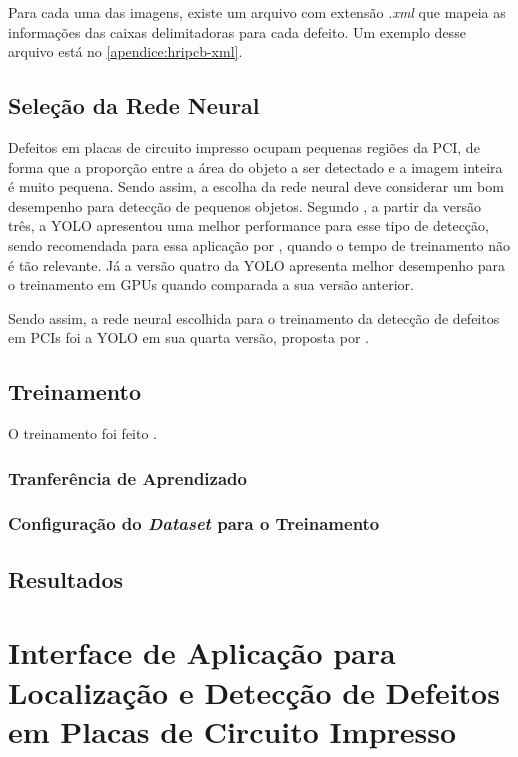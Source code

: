 Para cada uma das imagens, existe um arquivo com extensão \textit{.xml} que mapeia as informações das caixas delimitadoras para cada defeito. Um exemplo desse arquivo está no \autoref{apendice:hripcb-xml}.

\section{Seleção da Rede Neural} \label{cap:treinamento-rn}

Defeitos em placas de circuito impresso ocupam pequenas regiões da PCI, de forma que a proporção entre a área do objeto a ser detectado e a imagem inteira é muito pequena. Sendo assim, a escolha da rede neural deve considerar um bom desempenho para detecção de pequenos objetos. Segundo , a partir da versão três, a YOLO apresentou uma melhor performance para esse tipo de detecção, sendo recomendada para essa aplicação por , quando o tempo de treinamento não é tão relevante. Já a versão quatro da YOLO apresenta melhor desempenho para o treinamento em GPUs quando comparada a sua versão anterior.

Sendo assim, a rede neural escolhida para o treinamento da detecção de defeitos em PCIs foi a YOLO em sua quarta versão, proposta por .

\section{Treinamento} \label{cap:treinamento-treinamento}
O treinamento foi feito \cite{ref:Colab}.

\subsection{Tranferência de Aprendizado} \label{cap:treinamento-rn}

\subsection{Configuração do \textit{Dataset} para o Treinamento} \label{cap:treinamento-treinamento-config}

\section{Resultados} \label{cap:treinamento-resultados}


\chapter{Interface de Aplicação para Localização e Detecção de Defeitos em Placas de Circuito Impresso} \label{cap:api}

